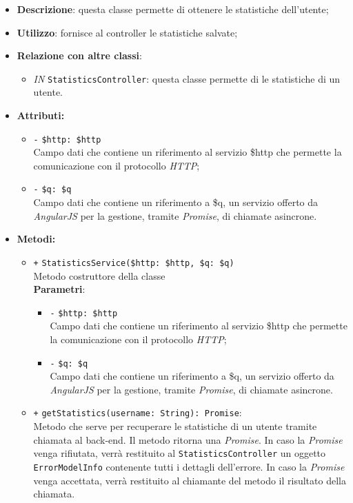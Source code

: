 \begin{itemize}
	\item \textbf{Descrizione}: questa classe permette di ottenere le statistiche dell'utente;
	\item \textbf{Utilizzo}: fornisce al controller le statistiche salvate;
	\item \textbf{Relazione con altre classi}:
	\begin{itemize}
		\item \textit{IN} \texttt{StatisticsController}: questa classe permette di le statistiche di un utente.
	\end{itemize}
	\item \textbf{Attributi:}
	\begin{itemize}
		\item \texttt{-} \texttt{\$http: \$http} \\ Campo dati che contiene un riferimento al servizio \$http che permette la comunicazione con il protocollo \textit{HTTP};
		\item \texttt{-} \texttt{\$q: \$q} \\ Campo dati che contiene un riferimento a \$q, un servizio offerto da \textit{AngularJS} per la gestione, tramite \textit{Promise}, di chiamate asincrone.
	\end{itemize}
	\item \textbf{Metodi:}
	\begin{itemize}
		\item \texttt{+} \texttt{StatisticsService(\$http: \$http, \$q: \$q)} \\ Metodo costruttore della classe \\
		\textbf{Parametri}:
		\begin{itemize}
			\item \texttt{-} \texttt{\$http: \$http} \\ Campo dati che contiene un riferimento al servizio \$http che permette la comunicazione con il protocollo \textit{HTTP};
			\item \texttt{-} \texttt{\$q: \$q} \\ Campo dati che contiene un riferimento a \$q, un servizio offerto da \textit{AngularJS} per la gestione, tramite \textit{Promise}, di chiamate asincrone.
		\end{itemize}
		\item \texttt{+} \texttt{getStatistics(username: String): Promise}: \\Metodo che serve per recuperare le statistiche di un utente tramite chiamata al back-end. Il metodo ritorna una \textit{Promise}. In caso la \textit{Promise} venga rifiutata, verrà restituito al \texttt{StatisticsController} un oggetto \texttt{ErrorModelInfo} contenente tutti i dettagli dell'errore. In caso la \textit{Promise} venga accettata, verrà restituito al chiamante del metodo il risultato della chiamata.\\

\end{itemize}
\end{itemize}

